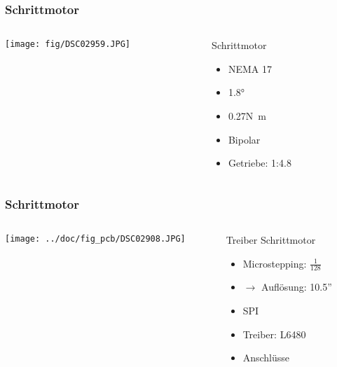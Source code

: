 \begin{frame}
    \frametitle{Schrittmotor}
    \begin{columns}
        \begin{column}{0.50\textwidth}
            \centering
            \texttt{[image: fig/DSC02959.JPG]}
        \end{column}
        \begin{column}{0.50\textwidth}
            \begin{block}{Schrittmotor}
                \begin{itemize}
                    \item NEMA 17
                    \item 1.8\si{\degree}
                    \item 0.27\si{\newton\metre}
                    \item Bipolar
                    \item Getriebe: 1:4.8
                \end{itemize}
            \end{block}
        \end{column}
    \end{columns}
\end{frame}
\begin{frame}
    \frametitle{Schrittmotor}
    \begin{columns}
        \begin{column}{0.50\textwidth}
            \centering
            \texttt{[image: ../doc/fig\_pcb/DSC02908.JPG]}
        \end{column}
        \begin{column}{0.50\textwidth}
            \begin{block}{Treiber Schrittmotor}
                \begin{itemize}
                    \item Microstepping: $\frac{1}{128}$
                    \item $\to$ Auflösung: 10.5''
                    \item SPI
                    \item Treiber: L6480
                    \item Anschlüsse
                \end{itemize}
            \end{block}
        \end{column}
    \end{columns}
\end{frame}
